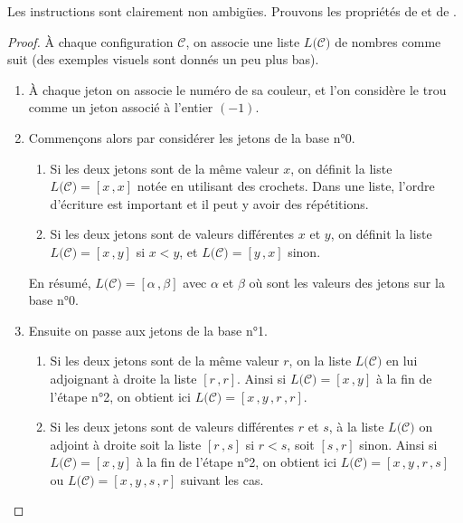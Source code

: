 \bigskip

Les instructions sont clairement non ambigües. Prouvons les propriétés de  et de .

\begin{proof}
	À chaque configuration $\mathscr{C}$, on associe une liste $L({\mathscr{C})}$ de nombres comme suit (des exemples visuels sont donnés un peu plus bas).
	
	\begin{enumerate}
		\item À chaque jeton on associe le numéro de sa couleur, et l'on considère le trou comme un jeton associé à l'entier $(-1)$.
		
		\item Commençons alors par considérer les jetons de la base n°0.
		
		\begin{enumerate}		
			\item Si les deux jetons sont de la même valeur $x$, on définit la liste $L({\mathscr{C})} = [x \, , x]$ notée en utilisant des crochets. Dans une liste, l'ordre d'écriture est important et il peut y avoir des répétitions.
		
			\item Si les deux jetons sont de valeurs différentes $x$ et $y$, on définit la liste $L({\mathscr{C})} = [x \, , y]$ si $x < y$, et $L({\mathscr{C})} = [y \, , x]$ sinon.
		\end{enumerate}
		
		En résumé, $L({\mathscr{C})} = [\alpha \, , \beta]$ avec $\alpha$ et $\beta$ où sont les valeurs des jetons sur la base n°0.
		
		\item Ensuite on passe aux jetons de la base n°1.
		
		\begin{enumerate}		
			\item Si les deux jetons sont de la même valeur $r$, on  la liste $L({\mathscr{C})}$ en lui adjoignant à droite la liste $[r \, , r]$. Ainsi si $L({\mathscr{C})} = [x \, , y]$ à la fin de l'étape n°2, on obtient ici $L({\mathscr{C})} = [x \, , y \, , r \, , r]$.
		
			\item Si les deux jetons sont de valeurs différentes $r$ et $s$, à la liste $L({\mathscr{C})}$ on adjoint à droite soit la liste $[r \, , s]$ si $r < s$, soit $[s \, , r]$ sinon. Ainsi si $L({\mathscr{C})} = [x \, , y]$ à la fin de l'étape n°2, on obtient ici $L({\mathscr{C})} = [x \, , y \, , r \, , s]$ ou $L({\mathscr{C})} = [x \, , y \, , s \, , r]$ suivant les cas.
		\end{enumerate}
		

\end{enumerate}
\end{proof}
